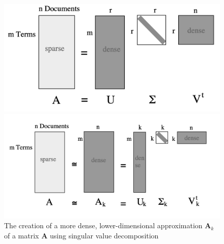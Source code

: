 \begin{figure}[H]
  \centering
  \hspace{-5em}
  \begin{minipage}[t]{.4\textwidth}
    \centering
    \vspace{0pt}
    \captionsetup{width=.91\linewidth}
    \includegraphics[scale=0.30]{figures/reduced-svd.png}
  \end{minipage}
  \hspace{4em}
  \begin{minipage}[t]{.4\textwidth}
    \centering
    \vspace{0pt}
    \captionsetup{width=.91\linewidth}
    \includegraphics[scale=0.35]{figures/reduced-svd-approx.png}
  \end{minipage}
  \caption{The creation of a more dense, lower-dimensional approximation $\bm{A}_k$ of a matrix $\bm{A}$ using singular value decomposition \parencite{albright-2004-taming}}\label{fig:svd}
\end{figure}
\vspace{-2.8em}
